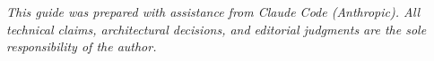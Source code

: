 \documentclass[11pt, oneside]{report}
\begin{document}
\vspace{1cm}
\noindent\textit{This guide was prepared with assistance from Claude Code (Anthropic). All technical claims, architectural decisions, and editorial judgments are the sole responsibility of the author.}

\newpage















\end{document}
